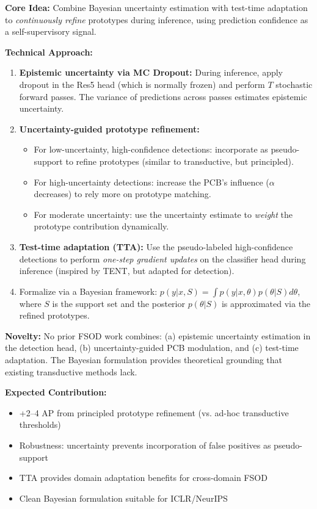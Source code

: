 \documentclass[11pt,a4paper]{article}
\begin{document}
\textbf{Core Idea:} Combine Bayesian uncertainty estimation with test-time adaptation to \textit{continuously refine} prototypes during inference, using prediction confidence as a self-supervisory signal.

\textbf{Technical Approach:}
\begin{enumerate}[nosep]
    \item \textbf{Epistemic uncertainty via MC Dropout:} During inference, apply dropout in the Res5 head (which is normally frozen) and perform $T$ stochastic forward passes. The variance of predictions across passes estimates epistemic uncertainty.
    \item \textbf{Uncertainty-guided prototype refinement:}
    \begin{itemize}[nosep]
        \item For low-uncertainty, high-confidence detections: incorporate as pseudo-support to refine prototypes (similar to transductive, but principled).
        \item For high-uncertainty detections: increase the PCB's influence ($\alpha$ decreases) to rely more on prototype matching.
        \item For moderate uncertainty: use the uncertainty estimate to \textit{weight} the prototype contribution dynamically.
    \end{itemize}
    \item \textbf{Test-time adaptation (TTA):} Use the pseudo-labeled high-confidence detections to perform \textit{one-step gradient updates} on the classifier head during inference (inspired by TENT, but adapted for detection).
    \item Formalize via a Bayesian framework: $p(y|x, S) = \int p(y|x, \theta) p(\theta|S) d\theta$, where $S$ is the support set and the posterior $p(\theta|S)$ is approximated via the refined prototypes.
\end{enumerate}

\textbf{Novelty:} No prior FSOD work combines: (a) epistemic uncertainty estimation in the detection head, (b) uncertainty-guided PCB modulation, and (c) test-time adaptation. The Bayesian formulation provides theoretical grounding that existing transductive methods lack.

\textbf{Expected Contribution:}
\begin{itemize}[nosep]
    \item +2--4 AP from principled prototype refinement (vs. ad-hoc transductive thresholds)
    \item Robustness: uncertainty prevents incorporation of false positives as pseudo-support
    \item TTA provides domain adaptation benefits for cross-domain FSOD
    \item Clean Bayesian formulation suitable for ICLR/NeurIPS
\end{itemize}
\end{document}
